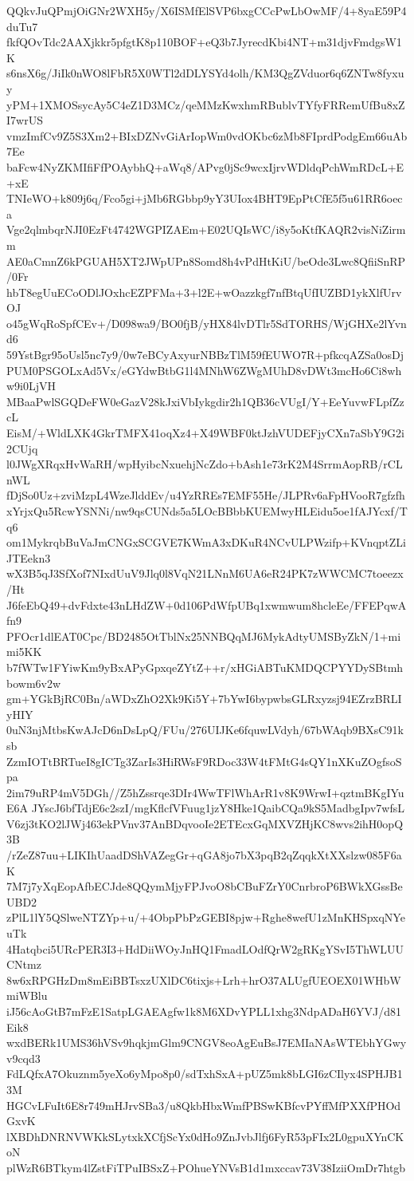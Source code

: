 QQkvJuQPmjOiGNr2WXH5y/X6ISMfElSVP6bxgCCcPwLbOwMF/4+8yaE59P4duTu7
fkfQOvTdc2AAXjkkr5pfgtK8p110BOF+eQ3b7JyrecdKbi4NT+m31djvFmdgsW1K
s6nsX6g/JiIk0nWO8lFbR5X0WTl2dDLYSYd4olh/KM3QgZVduor6q6ZNTw8fyxuy
yPM+1XMOSsycAy5C4eZ1D3MCz/qeMMzKwxhmRBublvTYfyFRRemUfBu8xZI7wrUS
vmzImfCv9Z5S3Xm2+BIxDZNvGiArIopWm0vdOKbc6zMb8FIprdPodgEm66uAb7Ee
baFcw4NyZKMIfiFfPOAybhQ+aWq8/APvg0jSc9wcxIjrvWDldqPchWmRDcL+E+xE
TNIeWO+k809j6q/Fco5gi+jMb6RGbbp9yY3UIox4BHT9EpPtCfE5f5u61RR6oeca
Vge2qlmbqrNJI0EzFt4742WGPIZAEm+E02UQIsWC/i8y5oKtfKAQR2visNiZirmm
AE0aCmnZ6kPGUAH5XT2JWpUPn8Somd8h4vPdHtKiU/beOde3Lwc8QfiiSnRP/0Fr
hbT8egUuECoODlJOxhcEZPFMa+3+l2E+wOazzkgf7nfBtqUfIUZBD1ykXlfUrvOJ
o45gWqRoSpfCEv+/D098wa9/BO0fjB/yHX84lvDTlr5SdTORHS/WjGHXe2lYvnd6
59YstBgr95oUsl5nc7y9/0w7eBCyAxyurNBBzTlM59fEUWO7R+pfkcqAZSa0osDj
PUM0PSGOLxAd5Vx/eGYdwBtbG1l4MNhW6ZWgMUhD8vDWt3mcHo6Ci8whw9i0LjVH
MBaaPwlSGQDeFW0eGazV28kJxiVbIykgdir2h1QB36cVUgI/Y+EeYuvwFLpfZzcL
EisM/+WldLXK4GkrTMFX41oqXz4+X49WBF0ktJzhVUDEFjyCXn7aSbY9G2i2CUjq
l0JWgXRqxHvWaRH/wpHyibcNxuehjNcZdo+bAsh1e73rK2M4SrrmAopRB/rCLnWL
fDjSo0Uz+zviMzpL4WzeJlddEv/u4YzRREs7EMF55He/JLPRv6aFpHVooR7gfzfh
xYrjxQu5RcwYSNNi/nw9qsCUNds5a5LOcBBbbKUEMwyHLEidu5oe1fAJYcxf/Tq6
om1MykrqbBuVaJmCNGxSCGVE7KWmA3xDKuR4NCvULPWzifp+KVnqptZLiJTEekn3
wX3B5qJ3SfXof7NIxdUuV9Jlq0l8VqN21LNnM6UA6eR24PK7zWWCMC7toeezx/Ht
J6feEbQ49+dvFdxte43nLHdZW+0d106PdWfpUBq1xwmwum8hcleEe/FFEPqwAfn9
PFOcr1dlEAT0Cpc/BD2485OtTblNx25NNBQqMJ6MykAdtyUMSByZkN/1+mimi5KK
b7fWTw1FYiwKm9yBxAPyGpxqeZYtZ++r/xHGiABTuKMDQCPYYDySBtmhbowm6v2w
gm+YGkBjRC0Bn/aWDxZhO2Xk9Ki5Y+7bYwI6bypwbsGLRxyzsj94EZrzBRLIyHIY
0uN3njMtbsKwAJcD6nDsLpQ/FUu/276UIJKe6fquwLVdyh/67bWAqb9BXsC91ksb
ZzmIOTtBRTueI8gICTg3ZarIs3HiRWsF9RDoc33W4tFMtG4sQY1nXKuZOgfsoSpa
2im79uRP4mV5DGh//Z5hZssrqe3DIr4WwTFlWhArR1v8K9WrwI+qztmBKgIYuE6A
JYscJ6bfTdjE6c2szI/mgKflcfVFuug1jzY8Hke1QaibCQa9kS5MadbgIpv7wfsL
V6zj3tKO2lJWj463ekPVnv37AnBDqvooIe2ETEcxGqMXVZHjKC8wvs2ihH0opQ3B
/rZeZ87uu+LIKIhUaadDShVAZegGr+qGA8jo7bX3pqB2qZqqkXtXXslzw085F6aK
7M7j7yXqEopAfbECJde8QQymMjyFPJvoO8bCBuFZrY0CnrbroP6BWkXGssBeUBD2
zPlL1lY5QSlweNTZYp+u/+4ObpPbPzGEBI8pjw+Rghe8wefU1zMnKHSpxqNYeuTk
4Hatqbci5URcPER3I3+HdDiiWOyJnHQ1FmadLOdfQrW2gRKgYSvI5ThWLUUCNtmz
8w6xRPGHzDm8mEiBBTsxzUXlDC6tixjs+Lrh+hrO37ALUgfUEOEX01WHbWmiWBlu
iJ56cAoGtB7mFzE1SatpLGAEAgfw1k8M6XDvYPLL1xhg3NdpADaH6YVJ/d81Eik8
wxdBERk1UMS36hVSv9hqkjmGlm9CNGV8eoAgEuBsJ7EMIaNAsWTEbhYGwyv9cqd3
FdLQfxA7Okuznm5yeXo6yMpo8p0/sdTxhSxA+pUZ5mk8bLGI6zCIlyx4SPHJB13M
HGCvLFuIt6E8r749mHJrvSBa3/u8QkbHbxWmfPBSwKBfcvPYffMfPXXfPHOdGxvK
lXBDhDNRNVWKkSLytxkXCfjScYx0dHo9ZnJvbJlfj6FyR53pFIx2L0gpuXYnCKoN
plWzR6BTkym4lZstFiTPuIBSxZ+POhueYNVsB1d1mxccav73V38IziiOmDr7htgb
